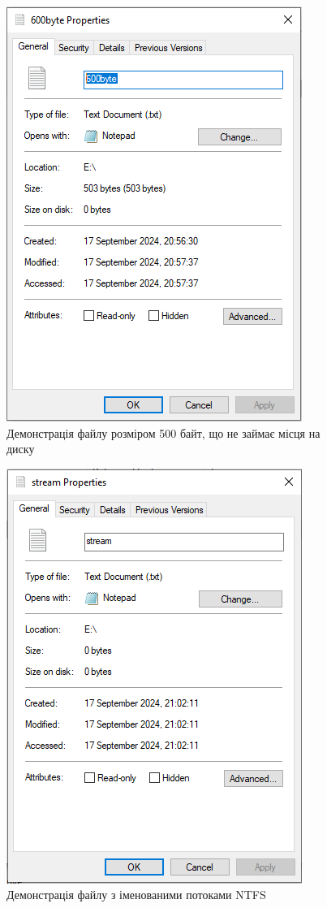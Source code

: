 \documentclass[oneside,14pt]{extarticle}
\begin{document}
\begin{normalsize}
	\begin{figure}[H]
		\centering
		\includegraphics[scale=0.6]{10}
		\caption{Демонстрація файлу розміром 500 байт, що не займає місця на диску}
	\end{figure}
	
	\begin{figure}[H]
		\centering
		\includegraphics[scale=0.6]{11}
		\caption{Демонстрація файлу з іменованими потоками NTFS}
	\end{figure}
	

\end{normalsize}
\end{document}
